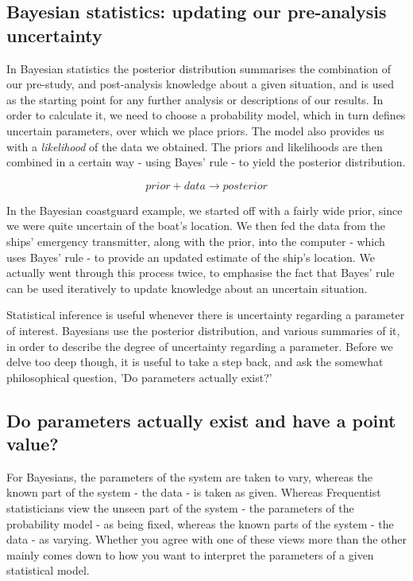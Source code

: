 \documentclass[11pt,fullpage]{book}
\begin{document}
\subsection{Bayesian statistics: updating our pre-analysis uncertainty}
In Bayesian statistics the posterior distribution summarises the combination of our pre-study, and post-analysis knowledge about a given situation, and is used as the starting point for any further analysis or descriptions of our results. In order to calculate it, we need to choose a probability model, which in turn defines uncertain parameters, over which we place priors. The model also provides us with a \textit{likelihood} of the data we obtained. The priors and likelihoods are then combined in a certain way - using Bayes' rule - to yield the posterior distribution.

\begin{equation}
prior + data \rightarrow posterior
\end{equation}

In the Bayesian coastguard example, we started off with a fairly wide prior, since we were quite uncertain of the boat's location. We then fed the data from the ships' emergency transmitter, along with the prior, into the computer - which uses Bayes' rule - to provide an updated estimate of the ship's location. We actually went through this process twice, to emphasise the fact that Bayes' rule can be used iteratively to update knowledge about an uncertain situation.

Statistical inference is useful whenever there is uncertainty regarding a parameter of interest. Bayesians use the posterior distribution, and various summaries of it, in order to describe the degree of uncertainty regarding a parameter. Before we delve too deep though, it is useful to take a step back, and ask the somewhat philosophical question, 'Do parameters actually exist?' 

\subsection{Do parameters actually exist and have a point value?}\label{sec:Posterior_parametersExist}
For Bayesians, the parameters of the system are taken to vary, whereas the known part of the system - the data - is taken as given. Whereas Frequentist statisticians view the unseen part of the system - the parameters of the probability model - as being fixed, whereas the known parts of the system - the data - as varying. Whether you agree with one of these views more than the other mainly comes down to how you want to interpret the parameters of a given statistical model. 
\end{document}
